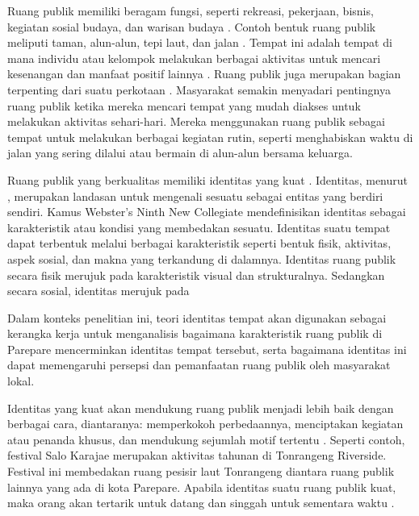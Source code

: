 \documentclass[11pt]{simart} %
\begin{document}
Ruang publik memiliki beragam fungsi, seperti rekreasi, pekerjaan, bisnis, kegiatan sosial budaya, dan warisan budaya \citep{hajmirsadeghi2012}. Contoh bentuk ruang publik meliputi taman, alun-alun, tepi laut, dan jalan \citep{hajmirsadeghi2012}. Tempat ini adalah tempat di mana individu atau kelompok melakukan berbagai aktivitas untuk mencari kesenangan dan manfaat positif lainnya \citep{hajmirsadeghi2012}.
Ruang publik juga merupakan bagian terpenting dari suatu perkotaan \citep{dong2004}. Masyarakat semakin menyadari pentingnya ruang publik ketika mereka mencari tempat yang mudah diakses untuk melakukan aktivitas sehari-hari. Mereka menggunakan ruang publik sebagai tempat untuk melakukan berbagai kegiatan rutin, seperti menghabiskan waktu di jalan yang sering dilalui atau bermain di alun-alun bersama keluarga.

Ruang publik yang berkualitas memiliki identitas yang kuat \citep{hartanti2014}. Identitas, menurut \cite{hartanti2014}, merupakan landasan untuk mengenali sesuatu sebagai entitas yang berdiri sendiri. Kamus Webster’s Ninth New Collegiate mendefinisikan identitas sebagai karakteristik atau kondisi yang membedakan sesuatu. Identitas suatu tempat dapat terbentuk melalui berbagai karakteristik seperti bentuk fisik, aktivitas, aspek sosial, dan makna yang terkandung di dalamnya. Identitas ruang publik secara fisik merujuk pada karakteristik visual dan strukturalnya. Sedangkan secara sosial, identitas merujuk pada





Dalam konteks penelitian ini, teori identitas tempat akan digunakan sebagai kerangka kerja untuk menganalisis bagaimana karakteristik ruang publik di Parepare mencerminkan identitas tempat tersebut, serta bagaimana identitas ini dapat memengaruhi persepsi dan pemanfaatan ruang publik oleh masyarakat lokal.




Identitas yang kuat akan mendukung ruang publik menjadi lebih baik dengan berbagai cara, diantaranya: memperkokoh perbedaannya, menciptakan kegiatan atau penanda khusus, dan mendukung sejumlah motif tertentu \citep{hartanti2014}. Seperti contoh, festival Salo Karajae merupakan aktivitas tahunan di Tonrangeng Riverside. Festival ini membedakan ruang pesisir laut Tonrangeng diantara ruang publik lainnya yang ada di kota Parepare. Apabila identitas suatu ruang publik kuat, maka orang akan tertarik untuk datang dan singgah untuk sementara waktu \citep{oktay2002}.
\end{document}
